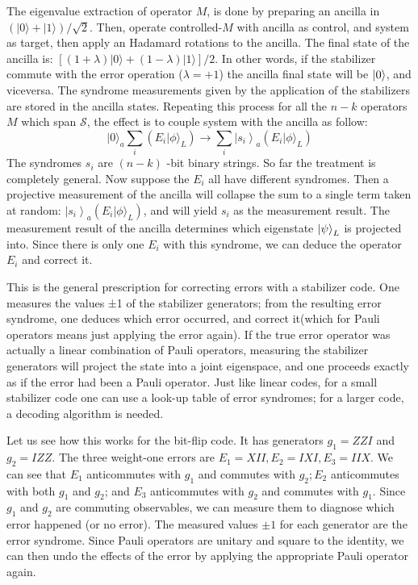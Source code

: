 The eigenvalue extraction of operator $M$, is done by preparing an ancilla in $(|0\rangle+|1\rangle) / \sqrt{2}$. 
Then, operate controlled-$M$ with ancilla as control, and system as target, then apply an Hadamard rotations to the ancilla. 
The final state of the ancilla is:  $[(1+\lambda)|0\rangle+(1-\lambda)|1\rangle] / 2$. In other words, if the stabilizer commute with the error operation ($\lambda=+1$) the ancilla final state will be $\ket{0}$, and viceversa. The syndrome measurements given by the application of the stabilizers are stored in the ancilla states. Repeating this process for all the $n-k$ operators $M$ which span $\mathcal{S}$, the effect is to couple system with the ancilla as follow:
$$
|0\rangle_{a} \sum_{i}\left(E_{i}|\phi\rangle_{L}\right) \rightarrow \sum_{i}\left|s_{i}\right\rangle_{a}\left(E_{i}|\phi\rangle_{L}\right)
$$
The syndromes $s_{i}$ are $(n-k)$ -bit binary strings. So far the treatment is completely general.
Now suppose the $E_{i}$ all have different syndromes. Then a projective measurement of the ancilla will collapse the sum to a single term taken at random: $\left|s_{i}\right\rangle_{a}\left(E_{i}|\phi\rangle_{L}\right)$, and will yield $s_{i}$ as the measurement result. 
The measurement result of the ancilla determines which eigenstate $\ket{\psi}_L$ is projected into.
Since there is only one $E_{i}$ with this syndrome, we can deduce the operator $E_{i}$ and correct it. 

This is the general prescription for correcting errors with a stabilizer code. One measures the values ±1 of the stabilizer generators; from the resulting error syndrome, one deduces which error occurred, and correct it(which for Pauli operators means just applying the error again). If the true error operator was actually a linear combination of Pauli operators, measuring the stabilizer generators will project the state into a joint eigenspace, and one proceeds exactly as if the error had been a Pauli operator. Just like linear codes, for a small stabilizer code one can use a look-up table of error syndromes; for a larger code, a decoding algorithm is needed.


Let us see how this works for the bit-flip code. It has generators $g_{1}=Z Z I$ and $g_{2}=I Z Z$. The three weight-one errors are $E_{1}=X I I, E_{2}=I X I, E_{3}=I I X .$ We can see that $E_{1}$ anticommutes with $g_{1}$ and commutes with $g_{2} ; E_{2}$ anticommutes with both $g_{1}$ and $g_{2}$; and $E_{3}$ anticommutes with $g_{2}$ and commutes with $g_{1}$. Since $g_{1}$ and $g_{2}$ are commuting observables, we can measure them to diagnose which error happened (or no error). The measured values $\pm 1$ for each generator are the error syndrome. Since Pauli operators are unitary and square to the identity, we can then undo the effects of the error by applying the appropriate Pauli operator again.

